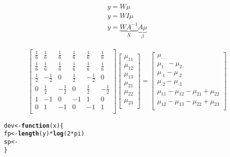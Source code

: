 \documentclass[12pt,letterpaper,oneside]{article}\usepackage{graphicx, color}
\makeatletter
\newcommand{\hlfunctioncall}[1]{\textcolor[rgb]{0.501960784313725,0,0.329411764705882}{\textbf{#1}}}%
\newenvironment{kframe}{%
 \def\at@end@of@kframe{}%
 \ifinner\ifhmode%
  \def\at@end@of@kframe{\end{minipage}}%
  \begin{minipage}{\columnwidth}%
 \fi\fi%
 \def\FrameCommand##1{\hskip\@totalleftmargin \hskip-\fboxsep
 \colorbox{shadecolor}{##1}\hskip-\fboxsep
     \hskip-\linewidth \hskip-\@totalleftmargin \hskip\columnwidth}%
 \MakeFramed {\advance\hsize-\width
   \@totalleftmargin\z@ \linewidth\hsize
   \@setminipage}}%
 {\par\unskip\endMakeFramed%
 \at@end@of@kframe}
\newenvironment{knitrout}{}{} %
\newcommand{\dateTaken}{January 7, 2013}
\makeatother
\begin{document}
\begin{align*}
    y=W\mu\\
    y=WI\mu\\
    y= \underbrace{WA^{-1}}_{X} \underbrace{A\mu}_{\beta}
\end{align*}


\begin{align*}
\begin{bmatrix}
    \frac{1}{6} & \frac{1}{6}& \frac{1}{6}& \frac{1}{6}& \frac{1}{6}& \frac{1}{6}\\
    \frac{1}{6} & \frac{1}{6}& \frac{1}{6}& \frac{1}{6}& \frac{1}{6}& \frac{1}{6}\\
    \frac{1}{2} & -\frac{1}{2}& 0& \frac{1}{2}& -\frac{1}{2}& 0\\
    0&\frac{1}{2} & -\frac{1}{2}& 0&\frac{1}{2}& -\frac{1}{2}\\
    1 & -1 & 0 & -1 & 1 & 0\\
    0 & 1 & -1 & 0 & -1 & 1\\
\end{bmatrix}
\begin{bmatrix}
    \mu_{11}\\
    \mu_{12}\\
    \mu_{13}\\
    \mu_{21}\\
    \mu_{22}\\
    \mu_{23}\\
\end{bmatrix}
=
\begin{bmatrix}
    \mu_{\cdot\cdot}\\
    \mu_{1\cdot} - \mu_{2\cdot}\\
    \mu_{\cdot1} - \mu_{\cdot2}\\
    \mu_{\cdot2} - \mu_{\cdot3}\\
    \mu_{11}  - \mu_{12} - \mu_{21}+ \mu_{22}\\
    \mu_{12}  - \mu_{13} - \mu_{22}+ \mu_{23}\\
\end{bmatrix}
\end{align*}
\renewcommand{\dateTaken}{February 12, 2013}
\daysep
\begin{knitrout}\scriptsize
{}\color{fgcolor}\begin{kframe}
\begin{alltt}
dev <- \hlfunctioncall{function}(x) \{
    fp <- \hlfunctioncall{length}(y) * \hlfunctioncall{log}(2* pi)
    sp <-
\}
\end{alltt}
\end{kframe}
\end{knitrout}
\end{document}
